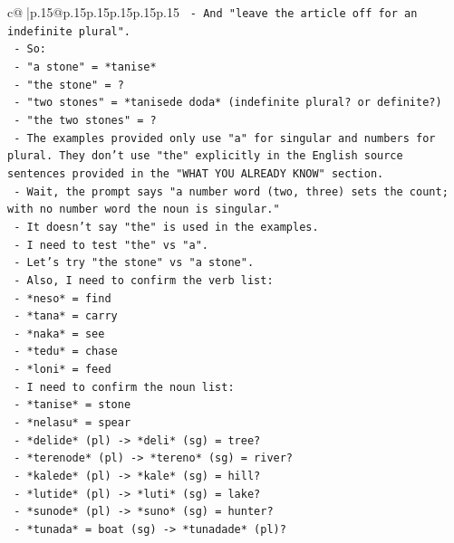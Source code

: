 \documentclass{article}
\begin{document}
{\begin{supertabular}{c@{$\;$}|p{.15\linewidth}@{}p{.15\linewidth}p{.15\linewidth}p{.15\linewidth}p{.15\linewidth}p{.15\linewidth}}
{{{\texttt{    {-} And "leave the article off for an indefinite plural".} \\
\texttt{    {-} So:} \\
\texttt{      {-} "a stone" = *tanise*} \\
\texttt{      {-} "the stone" = ?} \\
\texttt{      {-} "two stones" = *tanisede doda* (indefinite plural? or definite?)} \\
\texttt{      {-} "the two stones" = ?} \\
\texttt{    {-} The examples provided only use "a" for singular and numbers for plural. They don't use "the" explicitly in the English source sentences provided in the "WHAT YOU ALREADY KNOW" section.} \\
\texttt{    {-} Wait, the prompt says "a number word (two, three) sets the count; with no number word the noun is singular."} \\
\texttt{    {-} It doesn't say "the" is used in the examples.} \\
\texttt{    {-} I need to test "the" vs "a".} \\
\texttt{    {-} Let's try "the stone" vs "a stone".} \\
\texttt{    {-} Also, I need to confirm the verb list:} \\
\texttt{      {-} *neso* = find} \\
\texttt{      {-} *tana* = carry} \\
\texttt{      {-} *naka* = see} \\
\texttt{      {-} *tedu* = chase} \\
\texttt{      {-} *loni* = feed} \\
\texttt{    {-} I need to confirm the noun list:} \\
\texttt{      {-} *tanise* = stone} \\
\texttt{      {-} *nelasu* = spear} \\
\texttt{      {-} *delide* (pl) {-}> *deli* (sg) = tree?} \\
\texttt{      {-} *terenode* (pl) {-}> *tereno* (sg) = river?} \\
\texttt{      {-} *kalede* (pl) {-}> *kale* (sg) = hill?} \\
\texttt{      {-} *lutide* (pl) {-}> *luti* (sg) = lake?} \\
\texttt{      {-} *sunode* (pl) {-}> *suno* (sg) = hunter?} \\
\texttt{      {-} *tunada* = boat (sg) {-}> *tunadade* (pl)?} \\
}}}
\end{supertabular}}
\end{document}
